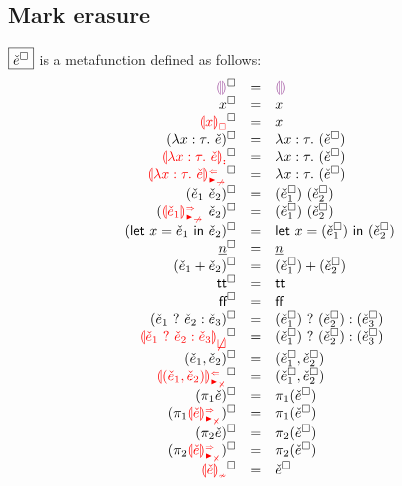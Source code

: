 \documentclass[formalism.tex]{subfiles}
\begin{document}
\subsection{Mark erasure}
\label{sec:marked-mark-erasure}
$\judgbox{\erase{\ECMV}}$ is a metafunction defined as follows:
%
\newcommand{\erasesToRow}[2]{\erase{#1} & = & #2}
\[\begin{array}{rcl}
  \erasesToRow{\ECEHole}{\EEHole} \\
  \erasesToRow{x}{x} \\
  \erasesToRow{\ECUnbound{x}}{x} \\
  \erasesToRow{(\ECLam{x}{\TMV}{\ECMV})}{\ELam{x}{\TMV}{(\erase{\ECMV})}} \\
  \erasesToRow{\ECLamInconAsc{x}{\TMV}{\ECMV}}{\ELam{x}{\TMV}{(\erase{\ECMV})}} \\
  \erasesToRow{\ECLamAnaNonMatchedArrow{x}{\TMV}{\ECMV}}{\ECLam{x}{\TMV}{(\erase{\ECMV})}} \\
  \erasesToRow{(\ECAp{\ECMV_1}{\ECMV_2})}{\EAp{(\erase{\ECMV_1})}{(\erase{\ECMV_2})}} \\
  \erasesToRow{(\ECApSynNonMatchedArrow{\ECMV_1}{\ECMV_2})}{\ECAp{(\erase{\ECMV_1})}{(\erase{\ECMV_2})}} \\
  \erasesToRow{(\ECLet{x}{\ECMV_1}{\ECMV_2})}{\ELet{x}{(\erase{\ECMV_1})}{(\erase{\ECMV_2})}} \\
  \erasesToRow{\ECNumMV}{\ENumMV} \\
  \erasesToRow{(\ECPlus{\ECMV_1}{\ECMV_2})}{\EPlus{(\erase{\ECMV_1})}{(\erase{\ECMV_2})}} \\
  \erasesToRow{\ECTrue}{\ETrue} \\
  \erasesToRow{\ECFalse}{\EFalse} \\
  \erasesToRow{(\ECIf{\ECMV_1}{\ECMV_2}{\ECMV_3})}{\EIf{(\erase{\ECMV_1})}{(\erase{\ECMV_2})}{(\erase{\ECMV_3})}} \\
  \erasesToRow{\ECInconBr{\ECMV_1}{\ECMV_2}{\ECMV_3}}{\EIf{(\erase{\ECMV_1})}{(\erase{\ECMV_2})}{(\erase{\ECMV_3})}} \\
  \erasesToRow{\ECPair{\ECMV_1}{\ECMV_2}}{\ECPair{\erase{\ECMV_1}}{\erase{\ECMV_2}}} \\
  \erasesToRow{\ECPairAnaNonMatchedProd{\ECMV_1}{\ECMV_2}}{\ECPair{\erase{\ECMV_1}}{\erase{\ECMV_2}}} \\
  \erasesToRow{(\ECProjL{\ECMV})}{\ECProjL{(\erase{\ECMV})}} \\
  \erasesToRow{(\ECProjLSynNonMatchedProd{\ECMV})}{\ECProjL{(\erase{\ECMV})}} \\
  \erasesToRow{(\ECProjR{\ECMV})}{\ECProjR{(\erase{\ECMV})}} \\
  \erasesToRow{(\ECProjRSynNonMatchedProd{\ECMV})}{\ECProjR{(\erase{\ECMV})}} \\
  \erasesToRow{\ECInconType{\ECMV}}{\erase{\ECMV}} \\
\end{array}\]
\end{document}
